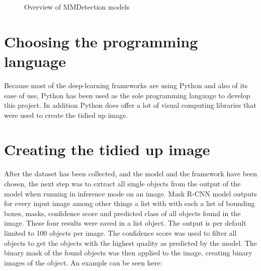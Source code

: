 \begin{figure}[H]
	\caption{\label{fig:mmdetection-models} Overview of MMDetection models}
\end{figure}

\section{Choosing the programming language}

Because most of the deep-learning frameworks are using Python and also of its ease of use, Python has been used as the sole programming language to develop this project. In addition Python does offer a lot of visual computing libraries that were used to create the tidied up image.

\section{Creating the tidied up image}

After the dataset has been collected, and the model and the framework have been chosen, the next step was to extract all single objects from the output of the model when running in inference mode on an image. Mask R-CNN model outputs for every input image among other things a list with with each a list of bounding boxes, masks, confidence score and predicted class of all objects found in the image. These four results were saved in a list object. The output is per default limited to 100 objects per image. The confidence score was used to filter all objects to get the objects with the highest quality as predicted by the model. The binary mask of the found objects was then applied to the image, creating binary images of the object. An example can be seen here:

